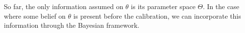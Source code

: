\documentclass[../../Main_ManuscritThese.tex]{subfiles}
\begin{document}

 So far, the only information assumed on $\theta$ is its parameter space $\Theta$. In the case where some belief on $\theta$ is present before the calibration, we can incorporate this information through the Bayesian framework.
\end{document}
